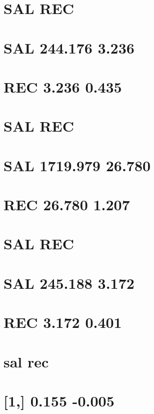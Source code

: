 \documentclass[]{book}
\theoremstyle{definition}
\theoremstyle{definition}
\theoremstyle{definition}
\theoremstyle{remark}
\begin{document}
\section{SAL REC}\label{sal-rec}

\section{SAL 244.176 3.236}\label{sal-244.176-3.236}

\section{REC 3.236 0.435}\label{rec-3.236-0.435}

\section{SAL REC}\label{sal-rec-1}

\section{SAL 1719.979 26.780}\label{sal-1719.979-26.780}

\section{REC 26.780 1.207}\label{rec-26.780-1.207}

\section{SAL REC}\label{sal-rec-2}

\section{SAL 245.188 3.172}\label{sal-245.188-3.172}

\section{REC 3.172 0.401}\label{rec-3.172-0.401}

\section{sal rec}\label{sal-rec-3}

\section{{[}1,{]} 0.155 -0.005}\label{section-24}
\end{document}
